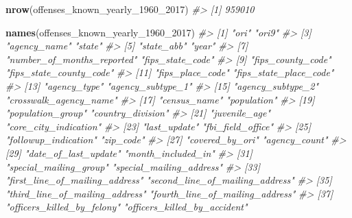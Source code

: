 \documentclass[
  12pt,
]{book}
\newenvironment{Shaded}{\begin{snugshade}}{\end{snugshade}}
\newcommand{\CommentTok}[1]{\textcolor[rgb]{0.37,0.37,0.37}{\textit{#1}}}
\newcommand{\DecValTok}[1]{\textcolor[rgb]{0.06,0.06,0.06}{#1}}
\newcommand{\KeywordTok}[1]{\textcolor[rgb]{0.27,0.27,0.27}{\textbf{#1}}}
\newcommand{\NormalTok}[1]{#1}
\begin{document}
\begin{Shaded}
\begin{Highlighting}[]
\KeywordTok{nrow}\NormalTok{(offenses\_known\_yearly\_}\DecValTok{1960}\NormalTok{\_}\DecValTok{2017}\NormalTok{)}
\CommentTok{\#\textgreater{} [1] 959010}
\end{Highlighting}
\end{Shaded}

\begin{Shaded}
\begin{Highlighting}[]
\KeywordTok{names}\NormalTok{(offenses\_known\_yearly\_}\DecValTok{1960}\NormalTok{\_}\DecValTok{2017}\NormalTok{)}
\CommentTok{\#\textgreater{}   [1] "ori"                            "ori9"                          }
\CommentTok{\#\textgreater{}   [3] "agency\_name"                    "state"                         }
\CommentTok{\#\textgreater{}   [5] "state\_abb"                      "year"                          }
\CommentTok{\#\textgreater{}   [7] "number\_of\_months\_reported"      "fips\_state\_code"               }
\CommentTok{\#\textgreater{}   [9] "fips\_county\_code"               "fips\_state\_county\_code"        }
\CommentTok{\#\textgreater{}  [11] "fips\_place\_code"                "fips\_state\_place\_code"         }
\CommentTok{\#\textgreater{}  [13] "agency\_type"                    "agency\_subtype\_1"              }
\CommentTok{\#\textgreater{}  [15] "agency\_subtype\_2"               "crosswalk\_agency\_name"         }
\CommentTok{\#\textgreater{}  [17] "census\_name"                    "population"                    }
\CommentTok{\#\textgreater{}  [19] "population\_group"               "country\_division"              }
\CommentTok{\#\textgreater{}  [21] "juvenile\_age"                   "core\_city\_indication"          }
\CommentTok{\#\textgreater{}  [23] "last\_update"                    "fbi\_field\_office"              }
\CommentTok{\#\textgreater{}  [25] "followup\_indication"            "zip\_code"                      }
\CommentTok{\#\textgreater{}  [27] "covered\_by\_ori"                 "agency\_count"                  }
\CommentTok{\#\textgreater{}  [29] "date\_of\_last\_update"            "month\_included\_in"             }
\CommentTok{\#\textgreater{}  [31] "special\_mailing\_group"          "special\_mailing\_address"       }
\CommentTok{\#\textgreater{}  [33] "first\_line\_of\_mailing\_address"  "second\_line\_of\_mailing\_address"}
\CommentTok{\#\textgreater{}  [35] "third\_line\_of\_mailing\_address"  "fourth\_line\_of\_mailing\_address"}
\CommentTok{\#\textgreater{}  [37] "officers\_killed\_by\_felony"      "officers\_killed\_by\_accident"   }

\end{Highlighting}
\end{Shaded}
\end{document}
